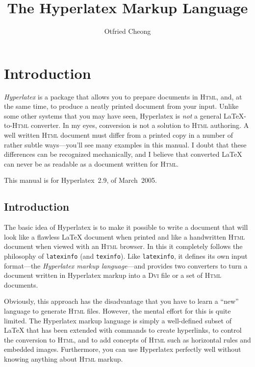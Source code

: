 \documentclass{article}
\title{The Hyperlatex Markup Language}
\author{Otfried Cheong}
\date{}
\newcommand{\+}{\verb+}
\renewcommand{\*}{\back{}}
\newcommand{\Html}{\textsc{Html}\xspace }
\newcommand{\latex}{\LaTeX\xspace }
\newcommand{\latexinfo}{\texttt{latexinfo}\xspace }
\newcommand{\texinfo}{\texttt{texinfo}\xspace }
\newcommand{\dvi}{\textsc{Dvi}\xspace }
\begin{document}
\maketitle

\T\section{Introduction}

\emph{Hyperlatex} is a package that allows you to prepare documents in
\Html, and, at the same time, to produce a neatly printed document
from your input. Unlike some other systems that you may have seen,
Hyperlatex is \emph{not} a general \latex-to-\Html converter.  In my
eyes, conversion is not a solution to \Html authoring.  A well written
\Html document must differ from a printed copy in a number of rather
subtle ways---you'll see many examples in this manual.  I doubt that
these differences can be recognized mechanically, and I believe that
converted \latex can never be as readable as a document written for
\Html.

This manual is for Hyperlatex~2.9, of March~2005.


\begin{ifhtml}
  \section{Introduction}
\end{ifhtml}

The basic idea of Hyperlatex is to make it possible to write a
document that will look like a flawless \latex document when printed
and like a handwritten \Html document when viewed with an \Html
browser. In this it completely follows the philosophy of \latexinfo
(and \texinfo).  Like \latexinfo, it defines its own input
format---the \emph{Hyperlatex markup language}---and provides two
converters to turn a document written in Hyperlatex markup into a \dvi
file or a set of \Html documents.

\label{philosophy}
Obviously, this approach has the disadvantage that you have to learn a
``new'' language to generate \Html files. However, the mental effort
for this is quite limited. The Hyperlatex markup language is simply a
well-defined subset of \latex that has been extended with commands to
create hyperlinks, to control the conversion to \Html, and to add
concepts of \Html such as horizontal rules and embedded images.
Furthermore, you can use Hyperlatex perfectly well without knowing
anything about \Html markup.
\end{document}
